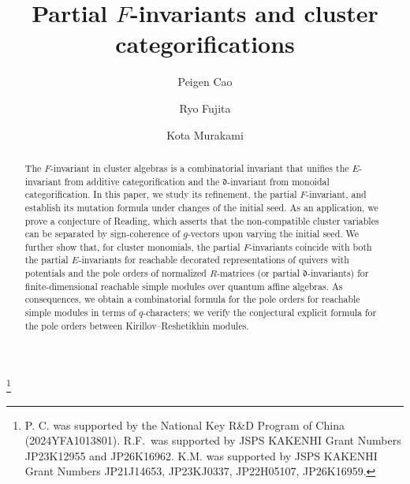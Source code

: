\documentclass[12pt]{amsart}
\theoremstyle{definition}
\theoremstyle{remark}
\numberwithin{equation}{section}
\begin{document}
\sloppy
\title[Partial $F$-invariants]{Partial $F$-invariants and cluster categorifications}




\author{Peigen Cao}
\address{School of Mathematical Sciences, University of Science and Technology of China, Hefei, 230026, People's Republic of China
}

\author{Ryo Fujita}
\address{Research Institute for Mathematical Sciences, Kyoto University, Kitashirakawa Oiwake-cho, Sakyo, Kyoto, 606-8502, Japan}

\author{Kota Murakami}
\address{Kyoto University Institute for Advanced Study (KUIAS), Kyoto University,
Yoshida Ushinomiya-cho, Sakyo-ku, Kyoto 606-8501, Japan}


\thanks{P. C. was supported by the National Key R\&D Program of China
(2024YFA1013801).
R.F.\ was supported by JSPS KAKENHI Grant Numbers JP23K12955 and JP26K16962. K.M. was supported by JSPS KAKENHI Grant Numbers JP21J14653, JP23KJ0337, JP22H05107, JP26K16959.}


\dedicatory{}



\date{}




\keywords{}



\begin{abstract}

The $F$-invariant in cluster algebras is a combinatorial invariant that unifies the $E$-invariant from additive categorification and the $\mathfrak{d}$-invariant from monoidal categorification. In this paper, we study its refinement, the partial $F$-invariant, and establish its mutation formula under changes of the initial seed. As an application, we prove a conjecture of Reading, which asserts that the non-compatible cluster variables can be separated by sign-coherence of $g$-vectors upon varying the initial seed. We further show that, for cluster monomials, the partial $F$-invariants coincide with both the partial $E$-invariants for reachable decorated representations of quivers with potentials and the pole orders of normalized $R$-matrices (or partial $\mathfrak{d}$-invariants) for finite-dimensional reachable simple modules over quantum affine algebras. As consequences, we obtain a combinatorial formula for the pole orders for reachable simple modules in terms of $q$-characters; we verify the conjectural explicit formula for the pole orders between Kirillov--Reshetikhin modules. 
\end{abstract}
\end{document}
